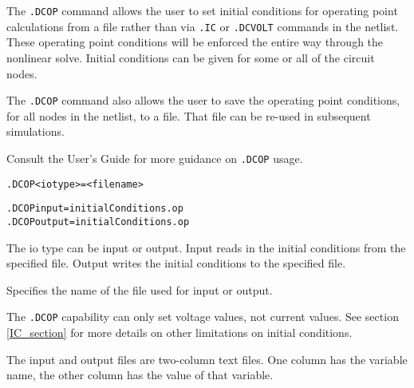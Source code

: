 


\label{DCOP_section}

The \texttt{.DCOP} command allows the user to set initial conditions for operating 
point calculations from a file rather than via \texttt{.IC} or \texttt{.DCVOLT}
commands in the netlist.  These operating point conditions will be enforced the entire 
way through the nonlinear solve.  Initial conditions can be given for some or all of 
the circuit nodes.

The \texttt{.DCOP} command also allows the user to save the operating point conditions,
for all nodes in the netlist, to a file.  That file can be re-used in subsequent
simulations.
 
Consult the \Xyce{} User's Guide for more guidance on \texttt{.DCOP} usage.  

\begin{Command}
\format
\begin{alltt}
.DCOP <io type>=<file name>
\end{alltt}

\examples
\begin{alltt}
.DCOP input=initialConditions.op
.DCOP output=initialConditions.op
\end{alltt}

\arguments
\begin{Arguments}
The io type can be input or output.  Input reads in the initial conditions from the
specified file.  Output writes the initial conditions to the specified file.

Specifies the name of the file used for input or output.
\end{Arguments}

\comments
The \texttt{.DCOP} capability can only set voltage values, not current values.  See 
section \ref{IC_section} for more details on other limitations on initial conditions.

The input and output files are two-column text files. One column has the variable name, 
the other column has the value of that variable.

\end{Command}

